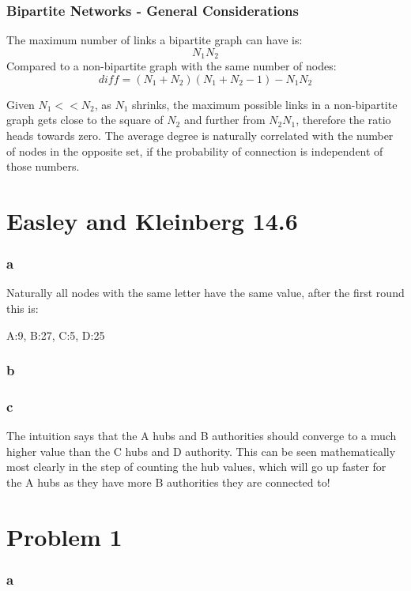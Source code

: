 \documentclass[a4paper,12pt]{article}
\begin{document}
\subsubsection*{Bipartite Networks - General Considerations}

The maximum number of links a bipartite graph can have is:
$$
N_1N_2
$$
Compared to a non-bipartite graph with the same number of nodes:
$$
diff = (N_1 + N_2)(N_1 + N_2 - 1) - N_1N_2
$$

Given $N_1 << N_2$, as $N_1$ shrinks, the maximum possible links in a non-bipartite graph gets close to the square of $N_2$ and further from $N_2N_1$, therefore the ratio heads towards zero.
%
The average degree is naturally correlated with the number of nodes in the opposite set, if the probability of connection is independent of those numbers.


\section*{Easley and Kleinberg 14.6}

\subsubsection*{a}
Naturally all nodes with the same letter have the same value, after the first round this is:

A:9, B:27, C:5, D:25

\subsubsection*{b}



\subsubsection*{c}
The intuition says that the A hubs and B authorities should converge to a much higher value than the C hubs and D authority. This can be seen mathematically most clearly in the step of counting the hub values, which will go up faster for the A hubs as they have more B authorities they are connected to!

\section*{Problem 1}

\subsubsection*{a}
\end{document}

